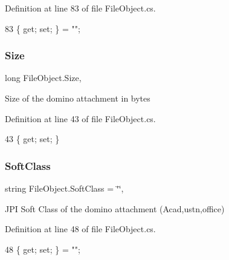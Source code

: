 Definition at line 83 of file File\+Object.\+cs.


\begin{DoxyCode}
83 \{ \textcolor{keyword}{get}; \textcolor{keyword}{set}; \} = \textcolor{stringliteral}{""};
\end{DoxyCode}
\mbox{\label{class_file_object_a7aa7737c1ce05f4424ba16dded444949}} 
\subsubsection{\texorpdfstring{Size}{Size}}
{\footnotesize\ttfamily long File\+Object.\+Size\hspace{0.3cm}{\ttfamily [get]}, {\ttfamily [set]}}



Size of the domino attachment in bytes 



Definition at line 43 of file File\+Object.\+cs.


\begin{DoxyCode}
43 \{ \textcolor{keyword}{get}; \textcolor{keyword}{set}; \}
\end{DoxyCode}
\mbox{\label{class_file_object_a5e9b8f083b53ea0450a0560c16292a2f}} 
\subsubsection{\texorpdfstring{Soft\+Class}{SoftClass}}
{\footnotesize\ttfamily string File\+Object.\+Soft\+Class = \char`\"{}\char`\"{}\hspace{0.3cm}{\ttfamily [get]}, {\ttfamily [set]}}



J\+PI Soft Class of the domino attachment (Acad,ustn,office) 



Definition at line 48 of file File\+Object.\+cs.


\begin{DoxyCode}
48 \{ \textcolor{keyword}{get}; \textcolor{keyword}{set}; \} = \textcolor{stringliteral}{""};
\end{DoxyCode}
\mbox{\label{class_file_object_a7355eaeea3fe40bd8862d7f1f9b479da}} 
